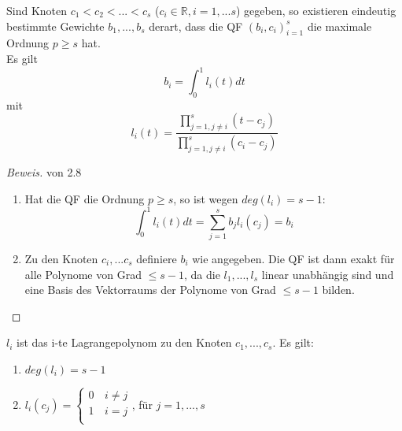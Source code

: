 \begin{theorem}
Sind Knoten $c_1 < c_2 < ... < c_s$ ($c_i \in \mathbb{R}, i = 1,...s$) gegeben, so existieren eindeutig bestimmte Gewichte $b_1 ,..., b_s$ derart, dass die QF $(b_i, c_i)_{i=1}^s$ die maximale Ordnung $p \geq s$ hat. \\
Es gilt $$b_i = \int_0^1 l_i(t) dt$$ mit $$l_i(t) = \frac{\prod_{j=1, j\neq i}^s (t-c_j)}{\prod_{j=1, j\neq i}^s (c_i-c_j)}$$

\begin{proof}[Beweis] von 2.8 \\
\begin{enumerate}
  \item Hat die QF die Ordnung $p \geq s$, so ist wegen $deg(l_i) = s-1$:
  $$ \int_0^1 l_i(t) dt = \sum_{j=1}^s b_j l_i(c_j) = b_i$$
  \item Zu den Knoten $c_i, ...c_s$ definiere $b_i$ wie angegeben. Die QF ist dann exakt für alle Polynome von Grad $ \leq s-1$, da die $l_1, ...,l_s$ linear unabhängig sind und eine Basis des Vektorraums der Polynome von Grad $\leq s-1$ bilden.
\end{enumerate}
\end{proof}
\end{theorem}

\begin{comment*}[zu Satz (2.8)]
$l_i$ ist das i-te Lagrangepolynom zu den Knoten $c_1, ...,c_s$. Es gilt:
\begin{enumerate}
  \item $deg(l_i) = s-1$
  \item $l_i(c_j) = \left\{
\begin{array}{ll}
0 & \,i \neq j \\
1 & \, i = j\\
\end{array}
\right. $, für $j=1,...,s$
\end{enumerate}

\end{comment*}
